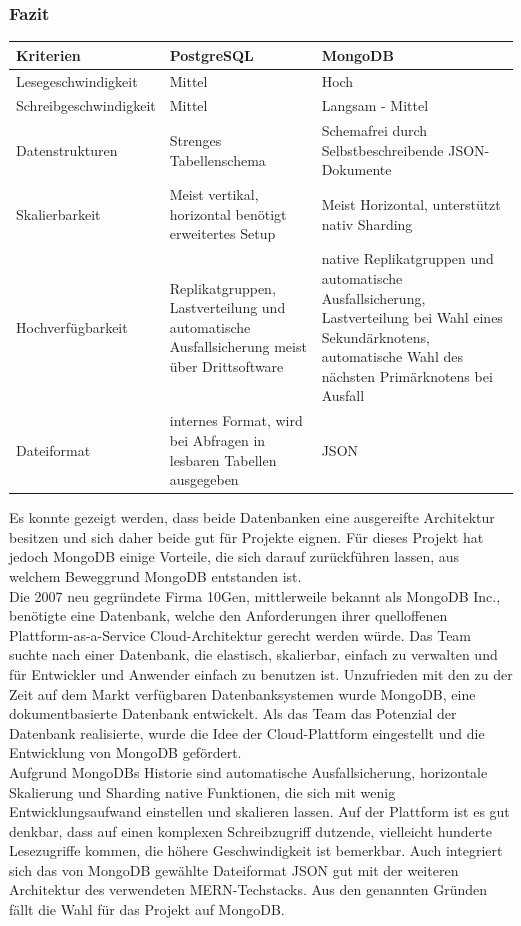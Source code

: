 \subsubsection{Fazit}
\begin{center}
    \begin{tabularx}{\linewidth}{ |X|X|X| } 
        \hline
        Kriterien & PostgreSQL & MongoDB  \\ 
        \hline
        Lesegeschwindigkeit & Mittel & Hoch \\
        Schreibgeschwindigkeit & Mittel & Langsam - Mittel \\
        Datenstrukturen & Strenges Tabellenschema & Schemafrei durch Selbstbeschreibende JSON-Dokumente \\
        Skalierbarkeit & Meist vertikal, horizontal benötigt erweitertes Setup & Meist Horizontal, unterstützt nativ Sharding \\
        Hochverfügbarkeit & Replikatgruppen, Lastverteilung und automatische Ausfallsicherung meist über Drittsoftware & native Replikatgruppen und automatische Ausfallsicherung, Lastverteilung bei Wahl eines Sekundärknotens, automatische Wahl des nächsten Primärknotens bei Ausfall \\
        Dateiformat & internes Format, wird bei Abfragen in lesbaren Tabellen ausgegeben & JSON \\
        \hline
    \end{tabularx}
\end{center}

Es konnte gezeigt werden, dass beide Datenbanken eine ausgereifte Architektur besitzen und sich daher beide gut für Projekte eignen. Für dieses Projekt hat jedoch MongoDB einige Vorteile, die sich darauf zurückführen lassen, aus welchem Beweggrund MongoDB entstanden ist.\\
Die 2007 neu gegründete Firma 10Gen, mittlerweile bekannt als MongoDB Inc., benötigte eine Datenbank, welche den Anforderungen ihrer quelloffenen Plattform-as-a-Service Cloud-Architektur gerecht werden würde. Das Team suchte nach einer Datenbank, die elastisch, skalierbar, einfach zu verwalten und für Entwickler und Anwender einfach zu benutzen ist. Unzufrieden mit den zu der Zeit auf dem Markt verfügbaren Datenbanksystemen wurde MongoDB, eine dokumentbasierte Datenbank entwickelt. Als das Team das Potenzial der Datenbank realisierte, wurde die Idee der Cloud-Plattform eingestellt und die Entwicklung von MongoDB gefördert.\cite{MG9}\\
Aufgrund MongoDBs Historie sind automatische Ausfallsicherung, horizontale Skalierung und Sharding native Funktionen, die sich mit wenig Entwicklungsaufwand einstellen und skalieren lassen. Auf der Plattform ist es gut denkbar, dass auf einen komplexen Schreibzugriff dutzende, vielleicht hunderte Lesezugriffe kommen, die höhere Geschwindigkeit ist bemerkbar. Auch integriert sich das von MongoDB gewählte Dateiformat JSON gut mit der weiteren Architektur des verwendeten MERN-Techstacks.
Aus den genannten Gründen fällt die Wahl für das Projekt auf MongoDB.


